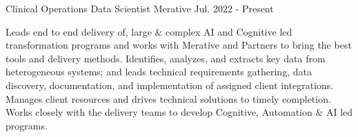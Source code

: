 

\begin{cventries}

  \cventry
    {Clinical Operations} %
    {Data Scientist} %
    {Merative}
    {Jul. 2022 - Present}
    {
      \begin{cvcompactparagraph}
        Leads end to end delivery of, large \& complex AI and Cognitive led transformation programs and works with Merative and Partners to bring the best tools and delivery methods.  Identifies, analyzes, and extracts key data from heterogeneous systems; and leads technical requirements gathering, data discovery, documentation, and implementation of assigned client integrations.  Manages client resources and drives technical solutions to timely completion.  Works closely with the delivery teams to develop Cognitive, Automation \& AI led programs.
      \end{cvcompactparagraph}
    }


\end{cventries}
